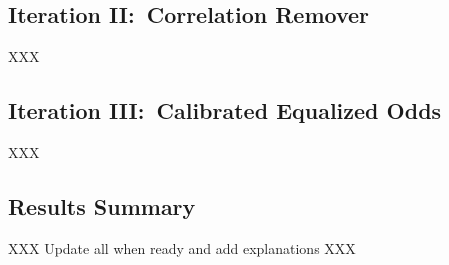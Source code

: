 \subsection{Iteration II:\ Correlation Remover}\label{subsec:Iteration_II}

XXX

\subsection{Iteration III:\ Calibrated Equalized Odds}\label{subsec:Iteration_III}

XXX

\subsection{Results Summary}\label{subsec:Results_Summary}

XXX Update all when ready and add explanations XXX

